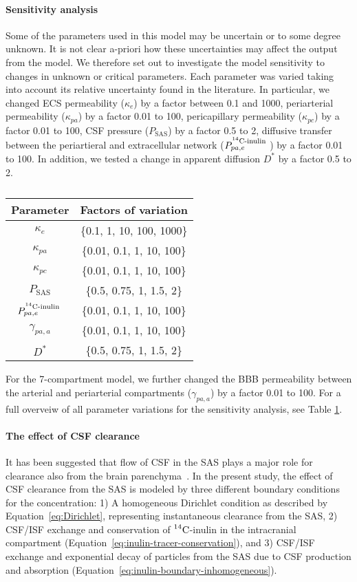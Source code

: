 \documentclass[10pt]{article}
\newcommand{\1}{^{(1)}}
\newcommand{\2}{^{(2)}}
\newcommand{\Cinulin}{$\prescript{14}{}{\text{C}}$-inulin }
\begin{document}
\paragraph{Sensitivity analysis}
Some of the parameters used in this model may be uncertain or to some degree unknown. It is not clear a-priori how these uncertainties may affect the output from the model. We therefore set out to investigate the model sensitivity to changes in unknown or critical parameters. Each parameter was varied  taking into account its relative uncertainty found in the literature. In particular, we changed ECS permeability ($\kappa_e$) by a factor between 0.1 and 1000, periarterial permeability ($\kappa_{pa}$) by a factor 0.01 to 100, pericapillary permeability ($\kappa_{pc}$) by a factor 0.01 to 100, CSF pressure ($P_\text{SAS}$) by a factor 0.5 to 2, diffusive transfer between the periartieral and extracellular network ($P^{\text{\Cinulin}}_{pa,e}$) by a factor 0.01 to 100. In addition, we tested a change in apparent diffusion $D^{*}$ by a factor 0.5 to 2. 
\begin{table}[h]
    \centering
    \begin{tabular}{c|c}
          Parameter & Factors of variation \\
         \hline 
         $\kappa_e$ & \{0.1, 1, 10, 100, 1000\} \\
         $\kappa_{pa}$ & \{0.01, 0.1, 1, 10, 100\} \\
         $\kappa_{pc}$ & \{0.01, 0.1, 1, 10, 100\} \\
         $P_\text{SAS}$ & \{0.5, 0.75, 1, 1.5, 2\} \\
         $P^{\text{\Cinulin}}_{pa,e}$ & \{0.01, 0.1, 1, 10, 100\} \\
         $\gamma_{pa , a}$ & \{0.01, 0.1, 1, 10, 100\} \\
         $D^{*}$ & \{0.5, 0.75, 1, 1.5, 2\} 
    \end{tabular}
    \caption{}
    \label{tab:variations}
\end{table}

For the 7-compartment model, we further changed the BBB permeability between the arterial and periarterial compartments ($\gamma_{pa , a}$) by a factor 0.01 to 100. For a full overveiw of all parameter variations for the sensitivity analysis, see Table \ref{tab:variations}.


\paragraph{The effect of CSF clearance}
It has been suggested that flow of CSF in the SAS plays a major role for clearance also from the brain parenchyma~\cite{proulx2021cerebrospinal, hornkjol2022csf}. In the present study, the effect of CSF clearance from the SAS is modeled by three different boundary conditions for the concentration: 1) A homogeneous Dirichlet condition as described by Equation~\eqref{eq:Dirichlet}, representing instantaneous clearance from the SAS, 2) CSF/ISF exchange and conservation of \Cinulin in the intracranial compartment (Equation~\eqref{eq:inulin-tracer-conservation}), and 3) CSF/ISF exchange and exponential decay of particles from the SAS due to CSF production and absorption (Equation~\eqref{eq:inulin-boundary-inhomogeneous}).
\end{document}
